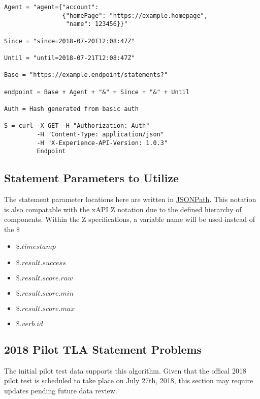 \documentclass{article}
\begin{document}
\begin{lstlisting}[frame=single]
Agent = "agent={"account":
                {"homePage": "https://example.homepage",
                 "name": 123456}}"

Since = "since=2018-07-20T12:08:47Z"

Until = "until=2018-07-21T12:08:47Z"

Base = "https://example.endpoint/statements?"

endpoint = Base + Agent + "&" + Since + "&" + Until

Auth = Hash generated from basic auth

S = curl -X GET -H "Authorization: Auth"
         -H "Content-Type: application/json"
         -H "X-Experience-API-Version: 1.0.3"
         Endpoint
\end{lstlisting}

\subsection{Statement Parameters to Utilize}
The statement parameter locations here are written in
\href{http://goessner.net/articles/JsonPath/}{JSONPath}. This notation
is also compatable with the xAPI Z notation due to the defined
hierarchy of components. Within the Z specifications, a variable name
will be used instead of the $\$$
\begin{itemize}
\item $\$.timestamp$
\item $\$.result.success$
\item $\$.result.score.raw$
\item $\$.result.score.min$
\item $\$.result.score.max$
\item $\$.verb.id$
\end{itemize}

\subsection{2018 Pilot TLA Statement Problems}
The initial pilot test data supports this algorithm.
Given that the offical 2018 pilot test is scheduled to take place on July
27th, 2018, this section may require updates pending future data review.
\end{document}
